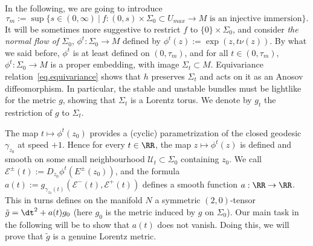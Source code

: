 In the following, we are going to introduce
\[
\tau_m := \sup\{ s \in (0,\infty) \ | \ f:(0,s) \times \Sigma_0 \subset U_{max} \to M
\text{ is an injective immersion}\}.
\]
It will be sometimes more suggestive to restrict $f$ to $\{0\} \times \Sigma_0$, and consider \emph{the normal flow of $\Sigma_0$}, $\phi^t: \Sigma_0 \to M$ defined by $\phi^t(z):=\exp(z,t \nu(z))$. By what we said before, $\phi^t$ is at least defined on $(0,\tau_m)$, and for all $t \in (0,\tau_m)$, $\phi^t: \Sigma_0 \to M$ is a proper embedding, with image $\Sigma_t \subset M$. Equivariance relation~\eqref{eq.equivariance} shows that $h$ preserves $\Sigma_t$ and acts on it as an Anosov diffeomorphism. In particular, the stable and unstable bundles must be lightlike for the metric $g$, showing that $\Sigma_t$ is a Lorentz torus. We denote by $g_t$ the restriction of $g$ to $\Sigma_t$.



The map $t \mapsto \phi^t(z_0)$ provides a (cyclic) parametrization of the closed geodesic $\gamma_{z_0}$ at speed $+1$. Hence for every $t \in \RR$, the map $z \mapsto \phi^t(z)$ is defined and smooth on some small neighbourhood ${\mathcal U_t} \subset \Sigma_0$ containing $z_0$. We call ${\mathcal E}^{\pm}(t):=D_{z_0}\phi^t(E^{\pm}(z_0))$, and the formula $a(t):=g_{\gamma_{z_0}(t)}({\mathcal E}^{-}(t),{\mathcal E}^{+}(t))$ defines a smooth function $a: \RR \to \RR$. This in turns defines on the manifold $N$ a symmetric $(2,0)$-tensor $\tilde{g}=\dt^2+a(t)g_{0}$ (here $g_0$ is the metric induced by $g$ on $\Sigma_0$). Our main task in the following will be to show that $a(t)$ does not vanish. Doing this, we will prove that $\tilde{g}$ is a genuine Lorentz metric.


